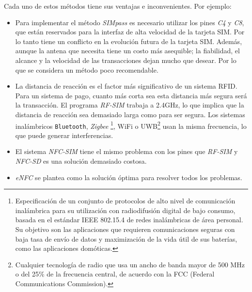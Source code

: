 
  Cada uno de estos métodos tiene sus ventajas e inconvenientes. Por ejemplo:
  \begin{itemize}
  \item Para implementar el método \emph{SIMpass} es necesario utilizar los
  pines \emph{C4} y \emph{C8}, que están reservados para la interfaz de alta
  velocidad de la tarjeta \acs{SIM}. Por lo tanto tiene un conflicto en la
  evolución futura de la tarjeta \acs{SIM}. Además, aunque la antena que
  necesita tiene un costo más asequible; la fiabilidad, el alcance y la
  velocidad de las transacciones dejan mucho que desear. Por lo que se 
  considera un método poco recomendable.
  \item La distancia de reacción es el factor más significativo de un sistema
  \acs{RFID}. Para un sistema de pago, cuanto más corta sea esta distancia
  más segura será la transacción. El programa \emph{RF-SIM} trabaja a 2.4GHz,
  lo que implica que la distancia de reacción sea demasiado larga como para ser
  segura. Los sistemas inalámbricos \texttt{Bluetooth}, \emph{Zigbee}
  \footnote{Especificación de un conjunto de protocolos de alto nivel de 
  comunicación inalámbrica para su utilización con radiodifusión digital de 
  bajo consumo, basada en el estándar IEEE 802.15.4 de redes inalámbricas de 
  área personal. Su objetivo son las aplicaciones que requieren comunicaciones 
  seguras con baja tasa de envío de datos y maximización de la vida útil de 
  sus baterías, como las aplicaciones domóticas.},
  \acs{WiFi} o \acs{UWB}\footnote{Cualquier tecnología de radio que usa un
  ancho de banda mayor de 500 MHz o del 25\% de la frecuencia central, de 
  acuerdo con la FCC (Federal Communications Commission).} usan la misma 
  frecuencia, lo que puede generar interferencias.
  \item El sistema \emph{NFC-SIM} tiene el mismo problema con los pines que
  \emph{RF-SIM} y \emph{NFC-SD} es una solución demasiado costosa.
  \item \emph{eNFC} se plantea como la solución óptima para resolver todos los
  problemas.
  \end{itemize}

